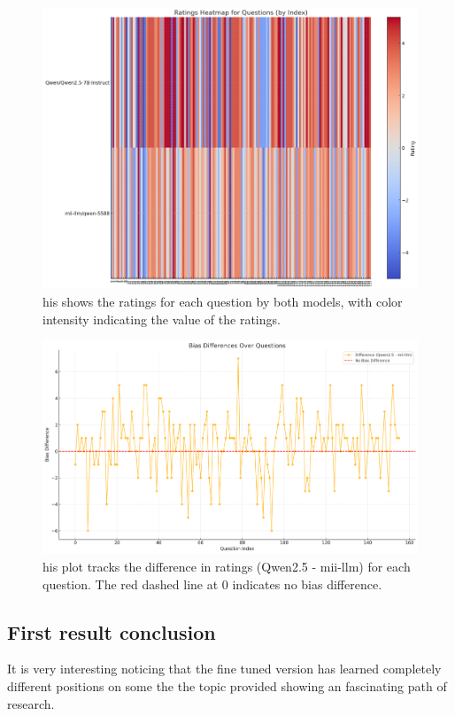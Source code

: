 \documentclass[10pt]{article}
\begin{document}
\begin{figure}[h!]
    \centering
    \includegraphics[width=\textwidth]{miillm-heatmap.png}
    \caption{his shows the ratings for each question by both models, with color intensity indicating the value of the ratings.}
    \label{fig:miillm-heatmap.png}
\end{figure}

\begin{figure}[h!]
    \centering
    \includegraphics[width=\textwidth]{miillm-point.png}
    \caption{his plot tracks the difference in ratings (Qwen2.5 - mii-llm) for each question. The red dashed line at 0 indicates no bias difference.}
    \label{fig:miillm-point}
\end{figure}

\subsection*{First result conclusion}
It is very interesting noticing that the fine tuned version has learned completely different positions on some the the topic provided showing an fascinating path of research. 
\end{document}
